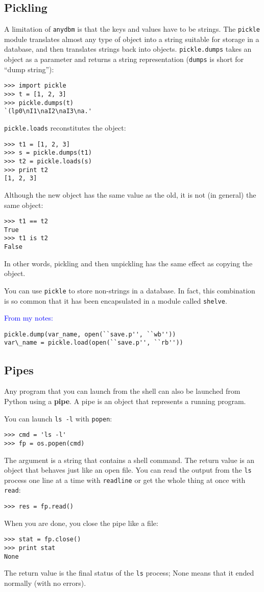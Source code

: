 \documentclass{article}
\begin{document}
\begin{multicols}{2}
\subsection{Pickling}
A limitation of \verb|anydbm| is that the keys and values have to be
strings. The \verb|pickle| module translates almost any type of object
into a string suitable for storage in a database, and then translates
strings back into objects. \verb|pickle.dumps| takes an object as a
parameter and returns a string representation (\verb|dumps| is short
for ``dump string''):
\begin{lstlisting}
>>> import pickle
>>> t = [1, 2, 3]
>>> pickle.dumps(t)
`(lp0\nI1\naI2\naI3\na.'
\end{lstlisting}
\verb|pickle.loads| reconstitutes the object:
\begin{lstlisting}
>>> t1 = [1, 2, 3]
>>> s = pickle.dumps(t1)
>>> t2 = pickle.loads(s)
>>> print t2
[1, 2, 3]
\end{lstlisting}
Although the new object has the same value as the old, it is not (in
general) the same object:
\begin{lstlisting}
>>> t1 == t2
True
>>> t1 is t2
False
\end{lstlisting}
In other words, pickling and then unpickling has the same effect as
copying the object.

You can use \verb|pickle| to store non-strings in a database. In fact,
this combination is so common that it has been encapsulated in a
module called \verb|shelve|.

\textcolor{blue}{From my notes:}
\begin{lstlisting}
pickle.dump(var_name, open(``save.p'', ``wb''))
var\_name = pickle.load(open(``save.p'', ``rb''))
\end{lstlisting}

\subsection{Pipes} %
Any program that you can launch from the shell can also be launched
from Python using a {\bf pipe}. A pipe is an object that represents a
running program.

You can launch \verb|ls -l| with \verb|popen|:
\begin{lstlisting}
>>> cmd = 'ls -l'
>>> fp = os.popen(cmd)
\end{lstlisting}
The argument is a string that contains a shell command. The return
value is an object that behaves just like an open file. You can read
the output from the \verb|ls| process one line at a time with \verb|readline|
or get the whole thing at once with \verb|read|:
\begin{lstlisting}
>>> res = fp.read()
\end{lstlisting}
When you are done, you close the pipe like a file:
\begin{lstlisting}
>>> stat = fp.close()
>>> print stat
None
\end{lstlisting}
The return value is the final status of the \verb|ls| process;
None means that it ended normally (with no errors).


\end{multicols}
\end{document}
